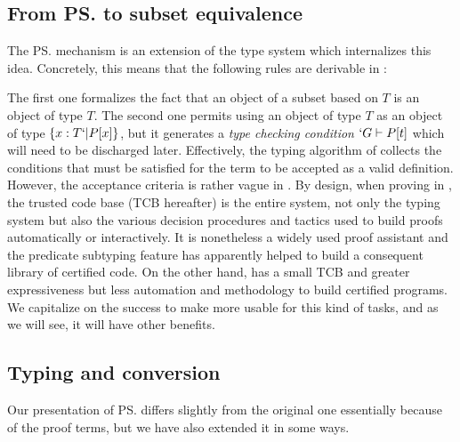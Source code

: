 \documentclass{llncs}
\begin{document}
\subsection{From \ps{} to subset equivalence}
The \ps{} mechanism \cite{Shankar&Owre:WADT99} %
is an extension of the \PVS type system which internalizes this idea.
Concretely, this means that the following rules are derivable in \PVS:
\begin{center}
  \DP
  \DP
\end{center}

The first one formalizes the fact that an object of a subset based on
$T$ is an object of type $T$. The second one permits using an object of
type $T$ as an object of type $\{ x : T `| P[x] \}$, but it generates a
\emph{type checking condition} $`G \vdash P[t]$ which will need to be
discharged later. Effectively, the typing algorithm of \PVS{} collects
the conditions that must be satisfied for the term to be accepted as a
valid definition. However, the acceptance criteria is rather vague in
\PVS{}. By design, when proving in \PVS{}, the trusted code base (TCB
hereafter) is the entire system, not only the typing system but also the
various decision procedures and tactics used to build proofs
automatically or interactively. It is nonetheless a widely used proof
assistant and the predicate subtyping feature has apparently helped to
build a consequent library of certified code. On the other hand, \Coq
has a small TCB and greater expressiveness but less automation and
methodology to build certified programs. We capitalize on the \PVS
success to make \Coq more usable for this kind of tasks, and as we will see,
it will have other benefits.

\subsection{Typing and conversion}
Our presentation of \ps{} differs slightly from the original one
essentially because of the proof terms, but we have also extended it in some ways. 
\end{document}
